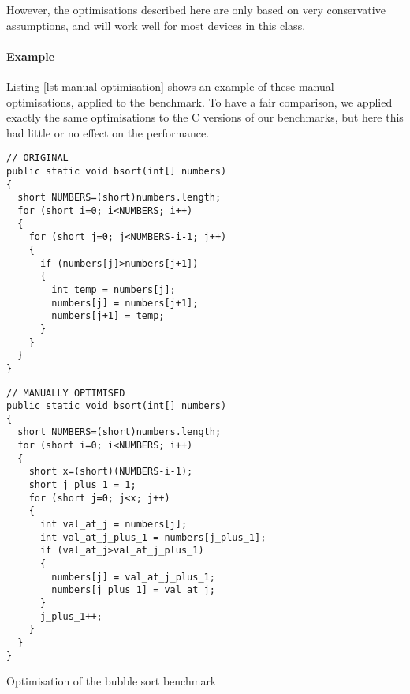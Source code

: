 However, the optimisations described here are only based on very conservative assumptions, and will work well for most devices in this class.

\paragraph{Example} Listing \ref{lst-manual-optimisation} shows an example of these manual optimisations, applied to the  benchmark. To have a fair comparison, we applied exactly the same optimisations to the C versions of our benchmarks, but here this had little or no effect on the performance.

\begin{listing}
\centering

\begin{minipage}[t]{0.47\textwidth}
\centering
  \begin{verbatim}
// ORIGINAL
public static void bsort(int[] numbers)
{
  short NUMBERS=(short)numbers.length;
  for (short i=0; i<NUMBERS; i++)
  {
    for (short j=0; j<NUMBERS-i-1; j++)
    {
      if (numbers[j]>numbers[j+1])
      {
        int temp = numbers[j];
        numbers[j] = numbers[j+1];
        numbers[j+1] = temp;
      }
    }
  }
}
\end{verbatim}
\end{minipage}
\hfill
\begin{minipage}[t]{0.52\textwidth}
\centering
\begin{verbatim}
// MANUALLY OPTIMISED
public static void bsort(int[] numbers)
{
  short NUMBERS=(short)numbers.length;
  for (short i=0; i<NUMBERS; i++)
  {
    short x=(short)(NUMBERS-i-1);
    short j_plus_1 = 1;
    for (short j=0; j<x; j++)
    {
      int val_at_j = numbers[j];
      int val_at_j_plus_1 = numbers[j_plus_1];
      if (val_at_j>val_at_j_plus_1)
      {
        numbers[j] = val_at_j_plus_1;
        numbers[j_plus_1] = val_at_j;
      }
      j_plus_1++;
    }
  }
}
\end{verbatim}
\end{minipage}
\caption{Optimisation of the bubble sort benchmark}
\label{lst-manual-optimisation}
\end{listing}


